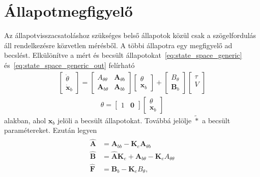 \section{Állapotmegfigyelő}
Az állapotvisszacsatoláshoz szükséges belső állapotok közül csak a szögelfordulás
áll rendelkezésre közvetlen mérésből. A többi állapotra egy megfigyelő ad becslést.
Elkülönítve a mért és becsült állapotokat~\eqref{eq:state_space_generic} és~\eqref{eq:state_space_generic_out} felírható
\begin{align}\label{eq:observer}
    \left[\begin{array}{c}
        \dot\theta \\ \hline
        \dot{\bm x}_b
    \end{array}\right]
    =
    \left[\begin{array}{c|c}
        A_{\theta\theta} & \bm A_{\theta b} \\ \hline
        \bm A_{b \theta} & \bm A_{bb}
    \end{array}\right]
    \left[\begin{array}{c}
        \theta \\ \hline
        \bm x_b
    \end{array}\right]
    +
    \left[\begin{array}{c}
        B_\theta \\ \hline
        \bm B_b
    \end{array}\right]
    \begin{bmatrix}
        \tau \\
        V \\
    \end{bmatrix}
\end{align}
\begin{align}\label{eq:observer_out}
    \theta = 
    \left[\begin{array}{c|c}
        1 & \bm 0
    \end{array}\right]
    \left[\begin{array}{c}
        \theta \\ \hline
        \bm x_b
    \end{array}\right]
\end{align}
alakban, ahol $\bm{x}_b$ jelöli a becsült állapotokat. Továbbá jelölje $\tilde{*}$ 
a becsült paramétereket. Ezután legyen
\begin{align}
    \begin{split}
    \hat{\bm A} &= \bm A_{bb} - \bm K_e \bm A_{\theta b} \\
    \hat{\bm B} &= \hat{\bm A} \bm K_e + \bm A_{b \theta} - \bm K_e A_{\theta \theta} \\
    \hat{\bm F} &= \bm B_b - \bm K_e B_\theta,
    \end{split}
\end{align}

